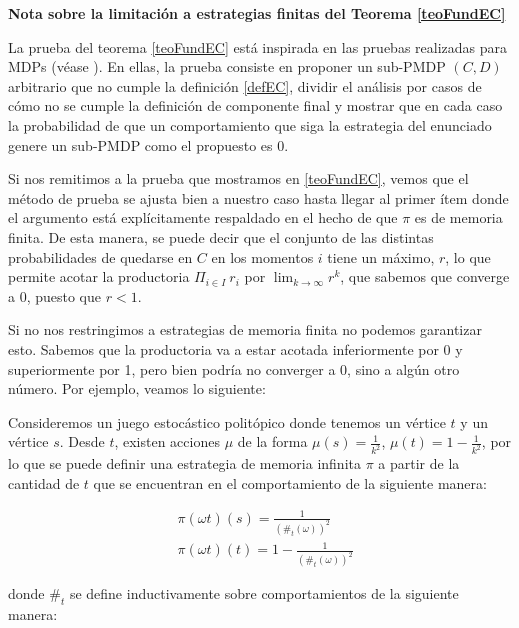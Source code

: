 \textbf{Nota sobre la limitación a estrategias finitas del Teorema \ref{teoFundEC}}

La prueba del teorema \ref{teoFundEC} está inspirada en las pruebas realizadas
para MDPs (véase \cite{BaierKatoen} \cite{AlfaroThesis}). En ellas, la prueba
consiste en proponer un sub-PMDP $(C, D)$ arbitrario que no cumple la
definición \ref{defEC}, dividir el análisis por casos de cómo no se cumple la
definición de componente final y mostrar que en cada caso la probabilidad de
que un comportamiento que siga la estrategia del enunciado genere un sub-PMDP
como el propuesto es 0.

Si nos remitimos a la prueba que mostramos en \ref{teoFundEC}, vemos que el
método de prueba se ajusta bien a nuestro caso hasta llegar al primer ítem
donde el argumento está explícitamente respaldado en el hecho de que $\pi$ es
de memoria finita. De esta manera, se puede decir que el conjunto de las
distintas probabilidades de quedarse en $C$ en los momentos $i$ tiene un
máximo, $r$, lo que permite acotar la productoria $\Pi_{i \in I} \ r_i$ por
$\lim_{k \to \infty} r^k$, que sabemos que converge a 0, puesto que $r < 1$.

Si no nos restringimos a estrategias de memoria finita no podemos garantizar
esto. Sabemos que la productoria va a estar acotada inferiormente por 0 y
superiormente por 1, pero bien podría no converger a 0, sino a algún otro
número. Por ejemplo, veamos lo siguiente:

Consideremos un juego estocástico politópico donde tenemos un vértice $t$ y un
vértice $s$. Desde $t$, existen acciones $\mu$ de la forma $\mu(s) =
	\frac{1}{k^2}$, $\mu(t) = 1 - \frac{1}{k^2}$, por lo que se puede definir una
estrategia de memoria infinita $\pi$ a partir de la cantidad de $t$ que se
encuentran en el comportamiento de la siguiente manera:

\begin{align*}
	&\pi(\omega t)(s) = \frac{1}{(\#_t(\omega))^2} \\
	&\pi(\omega t)(t) = 1- \frac{1}{(\#_t(\omega))^2}
\end{align*}

donde $\#_t$ se define inductivamente sobre comportamientos de la siguiente
manera:

